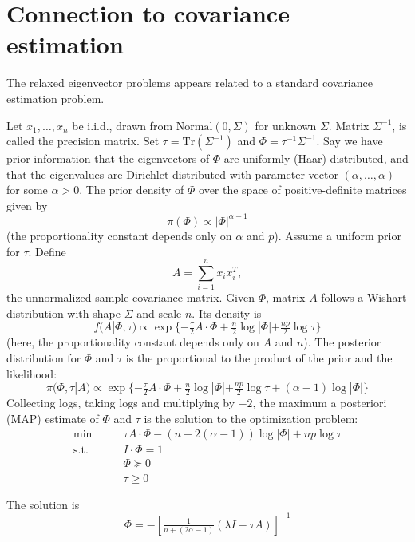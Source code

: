 \documentclass{article}
\begin{document}
\section{Connection to covariance estimation}
\label{S:connection-to-covariance}

The relaxed eigenvector problems appears related to a standard covariance estimation problem.


Let $x_1, \ldots, x_n$ be i.i.d., drawn from $\mathrm{Normal}(0, \Sigma)$
for unknown $\Sigma$.  Matrix $\Sigma^{-1}$, is called the precision
matrix.  Set $\tau = \mathrm{Tr}(\Sigma^{-1})$ and
$\Phi = \tau^{-1} \Sigma^{-1}$.  Say we have prior information that the
eigenvectors of $\Phi$ are uniformly (Haar) distributed, and that the
eigenvalues are Dirichlet distributed with parameter vector
$(\alpha, \ldots, \alpha)$ for some $\alpha > 0$.  The prior density
of $\Phi$ over the space of positive-definite matrices given by
\[
    \pi(\Phi) \propto |\Phi|^{\alpha-1}
\]
(the proportionality constant depends only on $\alpha$ and $p$).
Assume a uniform prior for $\tau$.
Define
\[
    A = \sum_{i=1}^n x_i x_i^T,
\]
the unnormalized sample covariance matrix.  Given $\Phi$, matrix $A$
follows a Wishart distribution with shape $\Sigma$ and scale $n$.  Its
density is
\[
    f(A | \Phi, \tau)
        \propto
        \exp\{
            -\tfrac{\tau}{2} A \cdot \Phi
            + \tfrac{n}{2} \log | \Phi| + \tfrac{np}{2} \log \tau
        \}
\]
(here, the proportionality constant depends only on $A$ and $n$).  The
posterior distribution for $\Phi$ and $\tau$ is the proportional to the
product of the prior and the likelihood:
\[
    \pi(\Phi, \tau | A)
        \propto
        \exp\{
            -\tfrac{\tau}{2} A \cdot \Phi
            + \tfrac{n}{2} \log | \Phi| + \tfrac{np}{2} \log \tau
            +
            (\alpha - 1)
            \log |\Phi|
        \}
\]
Collecting logs, taking logs and multiplying by $-2$, the maximum a
posteriori (MAP) estimate of $\Phi$ and $\tau$ is the solution to the
optimization problem:
\begin{align*}
    \min \qquad &\tau A \cdot \Phi - (n + 2 (\alpha - 1)) \log |\Phi| + np \log \tau \\
    \text{s.t.} \qquad & I \cdot \Phi = 1 \\
    \phantom{\text{s.t.}} \qquad & \Phi \succeq 0 \\
    \phantom{\text{s.t.}} \qquad & \tau \geq 0
\end{align*}

The solution is
\[
    \Phi = - [\tfrac{1}{n + (2\alpha - 1)}(\lambda I - \tau A)]^{-1}
\]
\end{document}
